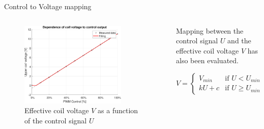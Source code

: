 \begin{frame}{Control to Voltage mapping}

    \begin{columns}[c, onlytextwidth]

        \begin{column}{0.60\textwidth}

            \begin{figure}
                \centering
                \includegraphics[width=0.8\textwidth]{img/MATLAB/identification/control_to_voltage.pdf}
                \caption{Effective coil voltage $V$ as a function of the control signal $U$}
            \end{figure}

        \end{column}

        \begin{column}{0.40\textwidth}

            Mapping between the control signal $U$ and the effective coil voltage $V$ has also been evaluated.

            \begin{equation}
                V = \begin{cases}
                    V_{min} & \text{if } U < U_{min}    \\
                    k U + c & \text{if } U \geq U_{min}
                \end{cases}
            \end{equation}

        \end{column}

    \end{columns}

\end{frame}



